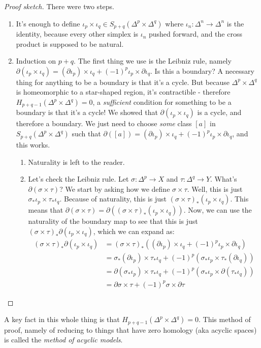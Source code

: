 \begin{proof}[Proof sketch]
There were two steps.
\begin{enumerate}
\item It's enough to define $\iota_p\times \iota_q\in S_{p+q}(\Delta^p\times \Delta^q)$ where $\iota_n:\Delta^n\to\Delta^n$ is the identity, because every other simplex is $\iota_n$ pushed forward, and the cross product is supposed to be natural.
\item Induction on $p+q$. The first thing we use is the Leibniz rule, namely $\partial(\iota_p\times\iota_q) = (\partial\iota_p)\times\iota_q + (-1)^p\iota_p\times\partial\iota_q$. Is this a boundary? A necessary thing for anything to be a boundary is that it's a cycle. But because $\Delta^p\times\Delta^q$ is homeomorphic to a star-shaped region, it's contractible - therefore $ H_{p+q-1}(\Delta^p\times\Delta^q)=0$, a \emph{sufficient} condition for something to be a boundary is that it's a cycle! We showed that $\partial(\iota_p\times\iota_q)$ is a cycle, and therefore a boundary. We just need to choose \emph{some} class $[a]$ in $S_{p+q}(\Delta^p\times\Delta^q)$ such that $\partial([a])=(\partial\iota_p)\times\iota_q + (-1)^p\iota_p\times\partial\iota_q$, and this works.
\begin{enumerate}
\item Naturality is left to the reader.
\item Let's check the Leibniz rule. Let $\sigma:\Delta^p\to X$ and $\tau:\Delta^q\to Y$. What's $\partial(\sigma\times\tau)$? We start by asking how we define $\sigma\times \tau$. Well, this is just $\sigma_\ast\iota_p\times\tau_\ast\iota_q$. Because of naturality, this is just $(\sigma\times\tau)_\ast(\iota_p\times\iota_q)$. This means that $\partial(\sigma\times\tau)=\partial((\sigma\times\tau)_\ast(\iota_p\times\iota_q))$. Now, we can use the naturality of the boundary map to see that this is just $(\sigma\times\tau)_\ast\partial(\iota_p\times\iota_q)$, which we can expand as:
\begin{align*}
(\sigma\times\tau)_\ast\partial(\iota_p\times\iota_q)& =(\sigma\times\tau)_\ast((\partial\iota_p)\times\iota_q + (-1)^p\iota_p\times\partial\iota_q) \\
& = \sigma_\ast(\partial\iota_p)\times\tau_\ast\iota_q + (-1)^{p}(\sigma_\ast\iota_p\times\tau_\ast(\partial\iota_q))\\
& = \partial(\sigma_\ast\iota_p)\times\tau_\ast\iota_q + (-1)^{p}(\sigma_\ast\iota_p\times\partial(\tau_\ast\iota_q))\\
& = \partial\sigma\times\tau + (-1)^{p}\sigma\times\partial\tau
\end{align*}
\end{enumerate}
\end{enumerate}
\end{proof}
A key fact in this whole thing is that $ H_{p+q-1}(\Delta^p\times\Delta^q)=0$. This method of proof, namely of reducing to things that have zero homology (aka acyclic spaces) is called the \emph{method of acyclic models}.

